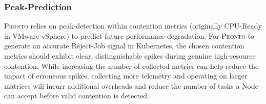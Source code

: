 %
%
%

\subsubsection{Peak-Prediction}
\textsc{Pronto} relies on peak-detection within contention metrics (originally
CPU-Ready in VMware vSphere) to predict future performance degradation. For
\textsc{Pronto} to generate an accurate Reject-Job signal in Kubernetes, the
chosen contention metrics should exhibit clear, distinguishable spikes during
genuine high-resource contention. While increasing the number of collected
metrics can help reduce the impact of erroneous spikes, collecting more
telemetry and operating on larger matrices will incurr additional overheads and
reduce the number of tasks a Node can accept before valid contention is
detected.

